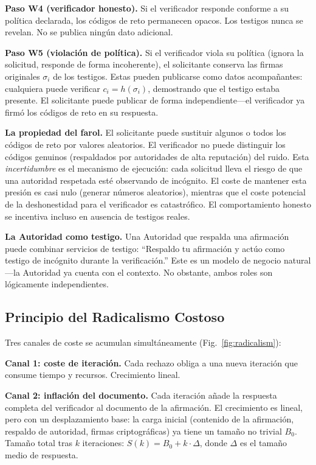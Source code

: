 \documentclass[11pt,a4paper,twocolumn]{article}
\begin{document}
\textbf{Paso W4 (verificador honesto).} Si el verificador responde conforme a su política declarada, los códigos de reto permanecen opacos. Los testigos nunca se revelan. No se publica ningún dato adicional.

\textbf{Paso W5 (violación de política).} Si el verificador viola su política (ignora la solicitud, responde de forma incoherente), el solicitante conserva las firmas originales $\sigma_i$ de los testigos. Estas pueden publicarse como datos acompañantes: cualquiera puede verificar $c_i = h(\sigma_i)$, demostrando que el testigo estaba presente. El solicitante puede publicar de forma independiente---el verificador ya firmó los códigos de reto en su respuesta.

\textbf{La propiedad del farol.} El solicitante puede sustituir algunos o todos los códigos de reto por valores aleatorios. El verificador no puede distinguir los códigos genuinos (respaldados por autoridades de alta reputación) del ruido. Esta \emph{incertidumbre} es el mecanismo de ejecución: cada solicitud lleva el riesgo de que una autoridad respetada esté observando de incógnito. El coste de mantener esta presión es casi nulo (generar números aleatorios), mientras que el coste potencial de la deshonestidad para el verificador es catastrófico. El comportamiento honesto se incentiva incluso en ausencia de testigos reales.

\textbf{La Autoridad como testigo.} Una Autoridad que respalda una afirmación puede combinar servicios de testigo: ``Respaldo tu afirmación y actúo como testigo de incógnito durante la verificación.'' Este es un modelo de negocio natural---la Autoridad ya cuenta con el contexto. No obstante, ambos roles son lógicamente independientes.

\subsection{Principio del Radicalismo Costoso}

Tres canales de coste se acumulan simultáneamente (Fig.~\ref{fig:radicalism}):

\textbf{Canal 1: coste de iteración.} Cada rechazo obliga a una nueva iteración que consume tiempo y recursos. Crecimiento lineal.

\textbf{Canal 2: inflación del documento.} Cada iteración añade la respuesta completa del verificador al documento de la afirmación. El crecimiento es lineal, pero con un desplazamiento base: la carga inicial (contenido de la afirmación, respaldo de autoridad, firmas criptográficas) ya tiene un tamaño no trivial $B_0$. Tamaño total tras $k$ iteraciones: $S(k) = B_0 + k \cdot \Delta$, donde $\Delta$ es el tamaño medio de respuesta.
\end{document}
